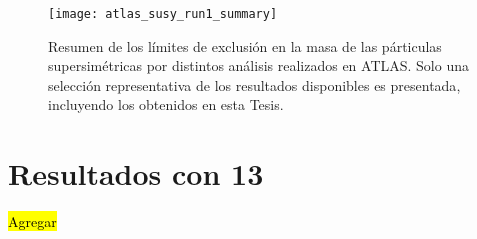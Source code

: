 \begin{figure}[!htb]
  \centering

  \texttt{[image: atlas\_susy\_run1\_summary]}

  \caption{Resumen de los límites de exclusión en la masa de las párticulas
    supersimétricas por distintos análisis realizados en ATLAS. Solo una
    selección representativa de los resultados disponibles es
    presentada\cite{susy_summary}, incluyendo los obtenidos en esta Tesis.}
  \label{fig:susy_summary}

\end{figure}


\section{Resultados con 13 \tev}
\label{sec:13tev}

\hl{Agregar}
